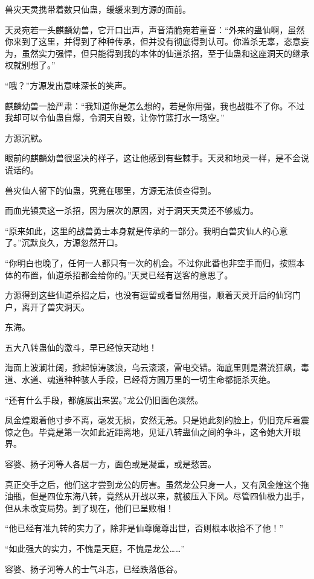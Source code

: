 \begin{this_body}
兽灾天灵携带着数只仙蛊，缓缓来到方源的面前。

天灵宛若一头麒麟幼兽，它开口出声，声音清脆宛若童音：“外来的蛊仙啊，虽然你来到了这里，并得到了种种传承，但并没有彻底得到认可。你滥杀无辜，恣意妄为，虽然实力强悍，但只能得到我的本体的仙道杀招，至于仙蛊和这座洞天的继承权就别想了。”

“哦？”方源发出意味深长的笑声。

麒麟幼兽一脸严肃：“我知道你是怎么想的，若是你用强，我也战胜不了你。不过我却可以令仙蛊自爆，令洞天自毁，让你竹篮打水一场空。”

方源沉默。

眼前的麒麟幼兽很坚决的样子，这让他感到有些棘手。天灵和地灵一样，是不会说谎话的。

兽灾仙人留下的仙蛊，究竟在哪里，方源无法侦查得到。

而血光镇灵这一杀招，因为层次的原因，对于洞天天灵还不够威力。

“原来如此，这里的战兽勇士本身就是传承的一部分。我明白兽灾仙人的心意了。”沉默良久，方源忽然开口。

“你明白也晚了，任何一人都只有一次的机会。不过你此番也非空手而归，按照本体的布置，仙道杀招都会给你的。”天灵已经有送客的意思了。

方源得到这些仙道杀招之后，也没有逗留或者冒然用强，顺着天灵开启的仙窍门户，离开了兽灾洞天。

东海。

五大八转蛊仙的激斗，早已经惊天动地！

海面上波澜壮阔，掀起惊涛骇浪，乌云滚滚，雷电交错。海底里则是潜流狂飙，毒道、水道、魂道种种骇人手段，已经将方圆万里的一切生命都扼杀灭绝。

“还有什么手段，都施展出来罢。”龙公仍旧面色淡然。

凤金煌跟着他寸步不离，毫发无损，安然无恙。只是她此刻的脸上，仍旧充斥着震惊之色。毕竟是第一次如此近距离地，见证八转蛊仙之间的争斗，这令她大开眼界。

容婆、扬子河等人各居一方，面色或是凝重，或是愁苦。

真正交手之后，他们这才尝到龙公的厉害。虽然龙公只身一人，又有凤金煌这个拖油瓶，但是四位东海八转，竟然从开战以来，就被压入下风。尽管四仙极力出手，但从未改变局势。到了现在，他们已呈败相！

“他已经有准九转的实力了，除非是仙尊魔尊出世，否则根本收拾不了他！”

“如此强大的实力，不愧是天庭，不愧是龙公……”

容婆、扬子河等人的士气斗志，已经跌落低谷。


\end{this_body}
